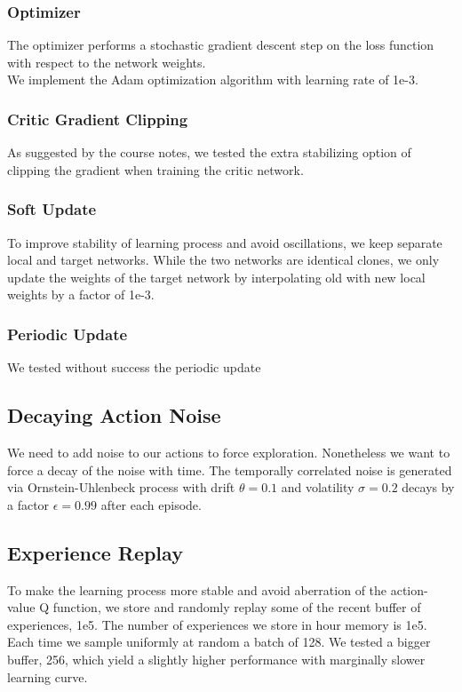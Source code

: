 \documentclass[pagenumber=off]{article}
\begin{document}
\subsubsection{Optimizer}

The optimizer performs a stochastic gradient descent step on the loss function with respect to the network weights.\\
We implement the Adam optimization algorithm with learning rate of 1e-3.\\


\subsubsection{Critic Gradient Clipping}

As suggested by the course notes, we tested the extra stabilizing option of clipping the gradient when training the critic network.


\subsubsection{Soft Update}

To improve stability of learning process and avoid oscillations, we keep separate local and target networks. While the two networks are identical clones, we only update the weights of the target network by interpolating old with new local weights by a factor of 1e-3.

\subsubsection{Periodic Update}

We tested without success the periodic update  


\subsection{Decaying Action Noise}
We need to add noise to our actions to force exploration. Nonetheless we want to force a decay of the noise with time.
The temporally correlated noise is generated via Ornstein-Uhlenbeck process with drift $\theta=0.1$ and volatility $\sigma=0.2$ decays by a factor $\epsilon=0.99$ after each episode.


\subsection{Experience Replay}
To make the learning process more stable and avoid aberration of the action-value Q function, we store and randomly replay some of the recent buffer of experiences, 1e5.
The number of experiences we store in hour memory is 1e5. Each time we sample uniformly at random a batch of 128. We tested a bigger buffer, 256, which yield a slightly higher performance with marginally slower learning curve.
\end{document}
